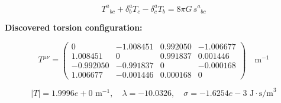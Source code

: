
\begin{equation}
  T^a{}_{bc} + \delta^a_b T_c - \delta^a_c T_b = 8\pi G \, s^a{}_{bc}
\end{equation}

\textbf{Discovered torsion configuration:}

\begin{equation}
  T^{\mu\nu} = \begin{pmatrix}
    0 & -1.008451 & 0.992050 & -1.006677 \\
    1.008451 & 0 & 0.991837 & 0.001446 \\
    -0.992050 & -0.991837 & 0 & -0.000168 \\
    1.006677 & -0.001446 & 0.000168 & 0
  \end{pmatrix} \quad \text{m}^{-1}
\end{equation}

\begin{equation}
  |T| = 1.9996e+0 \text{ m}^{-1}, \quad
  \lambda = -10.0326, \quad
  \sigma = -1.6254e-3 \text{ J}\cdot\text{s/m}^3
\end{equation}